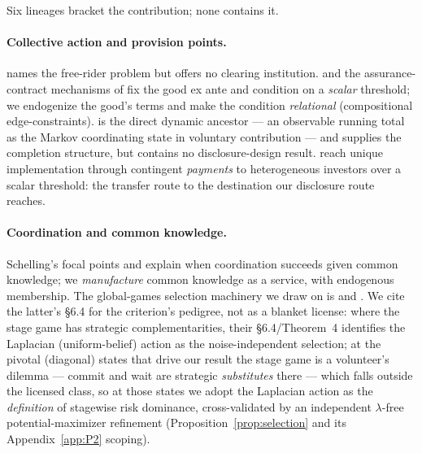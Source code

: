 \documentclass[11pt]{article}
\theoremstyle{definition}
\theoremstyle{remark}
\begin{document}
Six lineages bracket the contribution; none contains it.

\paragraph{Collective action and provision points.}
\citet{olson1965logic} names the free-rider problem but offers no clearing institution.
\citet{bagnoli1989provision} and the assurance-contract mechanisms of
\citet{tabarrok1998private} fix the good ex ante and condition on a \emph{scalar}
threshold; we endogenize the good's terms and make the condition \emph{relational}
(compositional edge-constraints). \citet{marxmatthews2000dynamic} is the direct dynamic
ancestor --- an observable running total as the Markov coordinating state in voluntary
contribution --- and supplies the completion structure, but contains no disclosure-design
result. \citet{halac2020raising} reach unique implementation through contingent
\emph{payments} to heterogeneous investors over a scalar threshold: the transfer route to
the destination our disclosure route reaches.

\paragraph{Coordination and common knowledge.}
Schelling's focal points and \citet{chwe2001rational} explain when coordination succeeds
given common knowledge; we \emph{manufacture} common knowledge as a service, with
endogenous membership. The global-games selection machinery we draw on is
\citet{carlsson1993global} and \citet{frankelmorrispauzner2003equilibrium}. We cite the
latter's \S6.4 for the criterion's pedigree, not as a blanket license: where the stage game
has strategic complementarities, their \S6.4/Theorem~4 identifies the Laplacian
(uniform-belief) action as the noise-independent selection; at the pivotal (diagonal)
states that drive our result the stage game is a volunteer's dilemma --- commit and wait
are strategic \emph{substitutes} there --- which falls outside the licensed class, so at
those states we adopt the Laplacian action as the \emph{definition} of stagewise risk
dominance, cross-validated by an independent $\lambda$-free potential-maximizer refinement
(Proposition~\ref{prop:selection} and its Appendix~\ref{app:P2} scoping).
\end{document}
